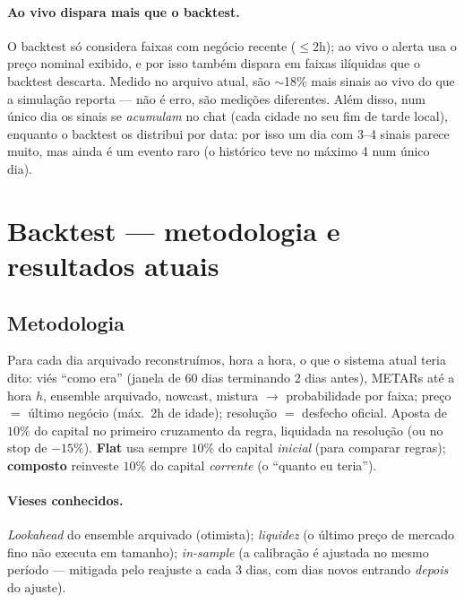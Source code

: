 \documentclass[11pt,a4paper]{article}
\begin{document}
\paragraph{Ao vivo dispara mais que o backtest.} O backtest só considera faixas
com negócio recente ($\le$2h); ao vivo o alerta usa o preço nominal exibido, e
por isso também dispara em faixas ilíquidas que o backtest descarta. Medido no
arquivo atual, são $\sim$18\% mais sinais ao vivo do que a simulação reporta ---
não é erro, são medições diferentes. Além disso, num único dia os sinais se
\emph{acumulam} no chat (cada cidade no seu fim de tarde local), enquanto o
backtest os distribui por data: por isso um dia com 3--4 sinais parece muito,
mas ainda é um evento raro (o histórico teve no máximo 4 num único dia).

\section{Backtest --- metodologia e resultados atuais}\label{sec:backtest}
\subsection{Metodologia}
Para cada dia arquivado reconstruímos, hora a hora, o que o sistema atual teria
dito: viés ``como era'' (janela de 60 dias terminando 2 dias antes), METARs até
a hora $h$, ensemble arquivado, nowcast, mistura $\rightarrow$ probabilidade por
faixa; preço $=$ último negócio (máx.\ 2h de idade); resolução $=$ desfecho
oficial. Aposta de $10\%$ do capital no primeiro cruzamento da regra, liquidada
na resolução (ou no stop de $-15\%$). \textbf{Flat} usa sempre $10\%$ do capital
\emph{inicial} (para comparar regras); \textbf{composto} reinveste $10\%$ do
capital \emph{corrente} (o ``quanto eu teria'').

\paragraph{Vieses conhecidos.} \emph{Lookahead} do ensemble arquivado
(otimista); \emph{liquidez} (o último preço de mercado fino não executa em
tamanho); \emph{in-sample} (a calibração é ajustada no mesmo período --- mitigada
pelo reajuste a cada 3 dias, com dias novos entrando \emph{depois} do ajuste).
\end{document}
